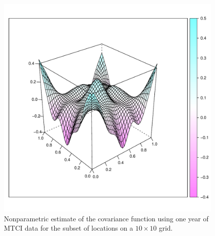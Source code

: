 \begin{figure}
	\centering 
	\includegraphics[width=0.5 
	\textwidth]{Images-future-work/region6-covfit.pdf} \caption{Nonparametric estimate of the covariance function using one year of MTCI data for the subset of locations on a $10\times 10$ grid.} \label{fig:region6 covfit} 
\end{figure}

